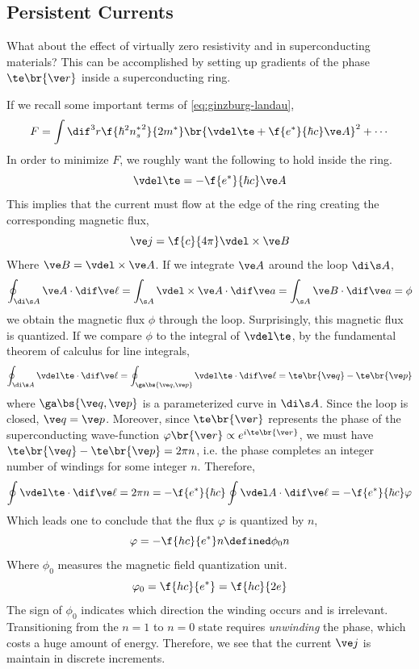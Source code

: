 \documentclass{article}
\newcommand{\vp}{\varphi}
\begin{document}
\subsection{Persistent Currents}
What about the effect of virtually zero resistivity and  in superconducting materials? This can be accomplished by setting up gradients of the phase $\te \br{\ve r}$ inside a superconducting ring.
\begin{center}
\end{center}
If we recall some important terms of \cref{eq:ginzburg-landau},
\[ F = \int \dif^3 r \f{\hbar^2 {n_s^*}^2}{2 m^*} \br{\vdel \te + \f{e^*}{\hbar c} \ve A}^2 + \cdots \]
In order to minimize $F$, we roughly want the following to hold inside the ring.
\[ \vdel \te = -\f{e^*}{\hbar c}\ve A\]
This implies that the current must flow at the edge of the ring creating the corresponding magnetic flux,
\[ \ve j = \f{c}{4\pi} \vdel \times \ve B \]
Where $\ve B = \vdel \times \ve A$. If we integrate $\ve A$ around the loop $\di \s A$,
\[ \oint_{\di \s A} \ve A \cdot \dif \ve \ell = \int_{\s A} \vdel \times \ve A \cdot \dif \ve a = \int_{\s A} \ve B \cdot \dif \ve a = \phi \]
we obtain the magnetic flux $\phi$ through the loop. Surprisingly, this magnetic flux is quantized. If we compare $\phi$ to the integral of $\vdel \te$, by the fundamental theorem of calculus for line integrals,
\[ \oint_{\di \s A} \vdel \te \cdot \dif \ve \ell = \oint_{\ga\bs{\ve q, \ve p}} \vdel \te \cdot \dif \ve \ell = \te\br{\ve q} - \te\br{\ve p} \]
where $\ga\bs{\ve q, \ve p}$ is a parameterized curve in $\di \s A$. Since the loop is closed, $\ve q = \ve p$. Moreover, since $\te\br{\ve r}$ represents the phase of the superconducting wave-function $\vp\br{\ve r} \propto e^{i \te \br{\ve r}}$, we must have $\te\br{\ve q} - \te\br{\ve p} = 2\pi n$, i.e. the phase completes an integer number of windings for some integer $n$. Therefore,
\[ \oint \vdel \te \cdot \dif \ve \ell = 2 \pi n = - \f{e^*}{\hbar c}\oint \vdel A \cdot \dif \ve \ell = - \f{e^*}{\hbar c} \vp \]
Which leads one to conclude that the flux $\vp$ is quantized by $n$,
\[ \vp = -\f{hc}{e^{*}} n \defined \phi_0 n \]
Where $\phi_0$ measures the magnetic field quantization unit.
\[ \vp_0 = \f{hc}{e^*} = \f{hc}{2e} \]
The sign of $\phi_0$ indicates which direction the winding occurs and is irrelevant. Transitioning from the $n=1$ to $n=0$ state requires \textit{unwinding} the phase, which costs a huge amount of energy. Therefore, we see that the current $\ve j$ is maintain in discrete increments.
\end{document}
